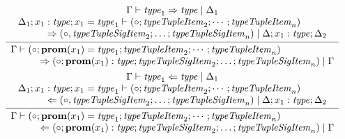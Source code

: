 \begin{gather*}
{\begin{array}{c}
\begin{array}{l}
      \end{array}
    \end{array}
  }
  \\
  \infer{
    \begin{array}{l}
      \Gamma \vdash (\circ; \mathbf{prom}(x_1) = \mathit{type}_1; \mathit{typeTupleItem}_2; \cdots; \mathit{typeTupleItem}_n)
      \\
      \hspace{3em}\Rightarrow (\circ; \mathbf{prom}(x_1): \mathit{type}; \mathit{typeTupleSigItem}_2; \ldots; \mathit{typeTupleSigItem}_n) \mid \Gamma
    \end{array}
  }{
    \begin{array}{c}
      \Gamma \vdash \mathit{type}_1 \Rightarrow \mathit{type} \mid \Delta_1
      \\
      \begin{array}{l}
        \Delta_1; x_1: \mathit{type}; x_1 = \mathit{type}_1 \vdash (\circ; \mathit{typeTupleItem}_2; \cdots; \mathit{typeTupleItem}_n)
        \\
        \hspace{3em}\Rightarrow (\circ, \mathit{typeTupleSigItem}_2; \ldots; \mathit{typeTupleSigItem}_n) \mid \Delta; x_1: \mathit{type}; \Delta_2
      \end{array}
    \end{array}
  }
  \\
  \infer{
    \begin{array}{l}
      \Gamma \vdash (\circ; \mathbf{prom}(x_1) = \mathit{type}_1; \mathit{typeTupleItem}_2; \cdots; \mathit{typeTupleItem}_n)
      \\
      \hspace{3em}\Leftarrow (\circ; \mathbf{prom}(x_1): \mathit{type}; \mathit{typeTupleSigItem}_2; \ldots; \mathit{typeTupleSigItem}_n) \mid \Gamma
    \end{array}
  }{
    \begin{array}{c}
      \Gamma \vdash \mathit{type}_1 \Leftarrow \mathit{type} \mid \Delta_1
      \\
      \begin{array}{l}
        \Delta_1; x_1: \mathit{type}; x_1 = \mathit{type}_1 \vdash (\circ; \mathit{typeTupleItem}_2; \cdots; \mathit{typeTupleItem}_n)
        \\
        \hspace{3em}\Leftarrow (\circ, \mathit{typeTupleSigItem}_2; \ldots; \mathit{typeTupleSigItem}_n) \mid \Delta; x_1: \mathit{type}; \Delta_2
      \end{array}
    \end{array}
  }
\end{gather*}

